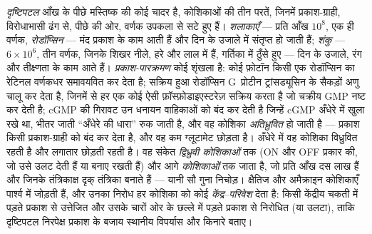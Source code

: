 \begin{definition}[दृष्टिपटल]\label{def:b3:sensory-systems:retina}
\emph{दृष्टिपटल} आँख के पीछे मस्तिष्क की कोई चादर है, कोशिकाओं की तीन
परतें, जिनमें प्रकाश-ग्राही, विरोधाभासी ढंग से, पीछे की ओर, वर्णक उपकला
से सटे हुए हैं। \emph{शलाकाएँ} --- प्रति आँख $10^{8}$, एक ही वर्णक,
\emph{रोडॉप्सिन} --- मंद प्रकाश के काम आती हैं और दिन के उजाले में
संतृप्त हो जाती हैं; \emph{शंकु} --- $6\times 10^{6}$, तीन वर्णक, जिनके
शिखर नीले, हरे और लाल में हैं, गर्तिका में ठुँसे हुए --- दिन के उजाले,
रंग और तीक्ष्णता के काम आते हैं। \emph{प्रकाश-पारक्रमण} कोई शृंखला है:
कोई फ़ोटॉन किसी एक रोडॉप्सिन का रेटिनल वर्णकधर समावयवित कर देता है;
सक्रिय हुआ रोडॉप्सिन G~प्रोटीन ट्रांसड्यूसिन के सैकड़ों अणु चालू कर
देता है, जिनमें से हर एक कोई ऐसी फ़ॉस्फ़ोडाइएस्टरेज़ सक्रिय करता है जो
चक्रीय GMP नष्ट कर देती है; cGMP की गिरावट उन धनायन वाहिकाओं को बंद कर
देती है जिन्हें cGMP अँधेरे में खुला रखे था, भीतर जाती ``अँधेरे की
धारा'' रुक जाती है, और वह कोशिका \emph{अतिध्रुवित} हो जाती है ---
प्रकाश किसी प्रकाश-ग्राही को बंद कर देता है, और वह कम ग्लूटामेट छोड़ता
है। अँधेरे में वह कोशिका विध्रुवित रहती है और लगातार छोड़ती रहती है। वह
संकेत \emph{द्विध्रुवी कोशिकाओं} तक (ON और OFF प्रकार की, जो उसे उलट
देती हैं या बनाए रखती हैं) और आगे \emph{ कोशिकाओं} तक जाता है,
जो प्रति आँख दस लाख हैं और जिनके तंत्रिकाक्ष दृक् तंत्रिका बनाते हैं
--- यानी सौ गुना निचोड़। क्षैतिज और अमैक्राइन कोशिकाएँ पार्श्व में
जोड़ती हैं, और उनका निरोध हर  कोशिका को कोई \emph{केंद्र--परिवेश}
 देता है: किसी केंद्रीय चकती में पड़ते प्रकाश से उत्तेजित
और उसके चारों ओर के छल्ले में पड़ते प्रकाश से निरोधित (या उलटा), ताकि
दृष्टिपटल निरपेक्ष प्रकाश के बजाय स्थानीय विपर्यास और किनारे बताए।
\end{definition}

